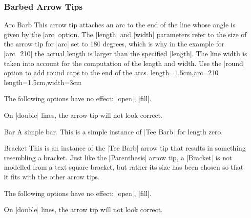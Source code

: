 \subsubsection{Barbed Arrow Tips}

\begin{arrowtip}{Arc Barb}{
    This arrow tip attaches an arc to the end of the line whose angle is given
    by the |arc| option. The |length| and |width| parameters refer to the size
    of the arrow tip for |arc| set to 180 degrees, which is why in the example
    for |arc=210| the actual length is larger than the specified |length|. The
    line width is taken into account for the computation  of the length and
    width. Use the |round| option to add round caps to the end of the arcs.
}%
{length=1.5cm,arc=210}%
{length=1.5cm,width=3cm}

    \begin{arrowexamples}
        \arrowexample[]
        \arrowexampledup[sep]
        \arrowexampledupdot[sep]
        \arrowexample[arc=120]
        \arrowexample[arc=270]
        \arrowexample[length=2pt]
        \arrowexample[length=2pt,width=5pt]
        \arrowexample[line width=2pt]
        \arrowexample[reversed]
        \arrowexample[round]
        \arrowexample[slant=.3]
        \arrowexample[left]
        \arrowexample[right]
        \arrowexample[red]
    \end{arrowexamples}
    The following options have no effect: |open|, |fill|.

    On |double| lines, the arrow tip will not look correct.
\end{arrowtip}

\begin{arrowtipsimple}{Bar}
    A simple bar. This is a simple instance of |Tee Barb| for length zero.
\end{arrowtipsimple}

\begin{arrowtip}{Bracket}{
    This is an instance of the |Tee Barb|  arrow tip that results in something
    resembling a bracket. Just like the |Parenthesis| arrow tip, a |Bracket| is
    not modelled from a text square bracket, but rather its size has been
    chosen so that it fits with the other arrow tips.
}%
{}%
{}

    \begin{arrowexamples}
        \arrowexample[]
        \arrowexampledup[sep]
        \arrowexampledupdot[sep]
        \arrowexample[reversed]
        \arrowexample[round]
        \arrowexample[slant=.3]
        \arrowexample[left]
        \arrowexample[right]
        \arrowexample[red]
    \end{arrowexamples}
    The following options have no effect: |open|, |fill|.

    On |double| lines, the arrow tip will not look correct.
\end{arrowtip}

